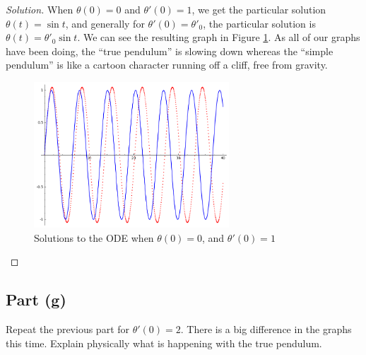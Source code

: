 \documentclass[letterpaper, 12pt]{amsart}
\theoremstyle{definition}  							%
\begin{document}
		\begin{proof}[Solution]
		When $\theta(0)=0$ and $\theta'(0)=1$, we get the particular solution $\theta(t) = \sin{t}$, and generally for $\theta'(0) = \theta'_{0}$, the particular solution is $\theta(t) = \theta'_{0}\sin{t}$. 
		We can see the resulting graph in Figure \ref{fastTheta1}.
		As all of our graphs have been doing, the ``true pendulum'' is slowing down whereas the ``simple pendulum'' is like a cartoon character running off a cliff, free from gravity.

		\begin{figure}[b]
			\includegraphics[width=0.65\textwidth]{images/fastTheta1.png}
			\caption{Solutions to the ODE when $\theta(0)=0$, and $\theta'(0)=1$}
			\label{fastTheta1}
		\end{figure}
		\end{proof}

		\subsection*{Part (g)}
		Repeat the previous part for $\theta'(0) = 2$. 
		There is a big difference in the graphs this time. 
		Explain physically what is happening with the true pendulum.
\end{document}
